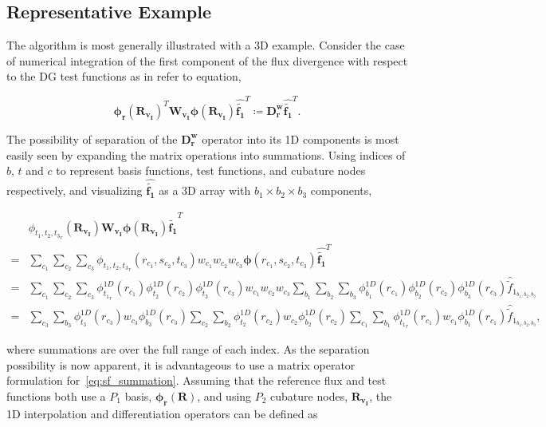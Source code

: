 \documentclass[12pt,Bold,letterpaper,TexShade]{mcgilletdclass}
\numberwithin{equation}{section}
\newcommand{\mat}[1]{\bm{{#1}}}
\newcommand{\vect}[1]{\bm{{#1}}}
\begin{document}
\subsection{Representative Example}
The algorithm is most generally illustrated with a 3D example. Consider the case of numerical integration of the first component of the flux divergence with respect to the DG test functions as in {\color{red} refer to equation},

\begin{equation} \nonumber
\vect{\phi_r}(\mat{R_{v_I}})^T \mat{W_{v_I}} \vect{\phi}(\mat{R_{v_I}}) \vect{\hat{\tilde{f_1}}}^T
\coloneqq
\mat{D^{w}_r} \vect{\hat{\tilde{f_1}}}^T.
\end{equation}

The possibility of separation of the $\mat{D^{w}_r}$ operator into its 1D components is most easily seen by expanding the matrix operations into summations. Using indices of $b$, $t$ and $c$ to represent basis functions, test functions, and cubature nodes respectively, and visualizing $\vect{\hat{\tilde{f_1}}}$ as a 3D array with $b_1 \times b_2 \times b_3$ components,

\begin{align} \label{eq:sf_summation}
& \phi_{{t_1,t_2,t_3}_r}(\mat{R_{v_I}}) \mat{W_{v_I}} \vect{\phi}(\mat{R_{v_I}}) \vect{\hat{\tilde{f_1}}}^T \nonumber \\
= &
\sum\limits_{c_1} \sum\limits_{c_2} \sum\limits_{c_3} 
\phi_{{t_1,t_2,t_3}_r}(r_{c_1},s_{c_2},t_{c_3})
w_{c_1} w_{c_2} w_{c_3}
\vect{\phi}(r_{c_1},s_{c_2},t_{c_3}) \vect{\hat{\tilde{f_1}}}^T \nonumber \\
= &
\sum\limits_{c_1} \sum\limits_{c_2} \sum\limits_{c_3}
\phi^{1D}_{{t_1}_r}(r_{c_1}) \phi^{1D}_{t_2}(r_{c_2}) \phi^{1D}_{t_3}(r_{c_3})
w_{c_1} w_{c_2} w_{c_3}
\sum\limits_{b_1} \sum\limits_{b_2} \sum\limits_{b_3}
\phi^{1D}_{b_1}(r_{c_1}) \phi^{1D}_{b_2}(r_{c_2}) \phi^{1D}_{b_3}(r_{c_3})
\hat{\tilde{f}}_{1_{b_1,b_2,b_3}} \nonumber \\
= &
\sum\limits_{c_3} \sum\limits_{b_3} \phi^{1D}_{t_3}(r_{c_3}) w_{c_3} \phi^{1D}_{b_3}(r_{c_3})
\sum\limits_{c_2} \sum\limits_{b_2} \phi^{1D}_{t_2}(r_{c_2}) w_{c_2} \phi^{1D}_{b_2}(r_{c_2}) 
\sum\limits_{c_1} \sum\limits_{b_1} \phi^{1D}_{{t_1}_r}(r_{c_1}) w_{c_1} \phi^{1D}_{b_1}(r_{c_1})
\hat{\tilde{f}}_{1_{b_1,b_2,b_3}},
\end{align}

where summations are over the full range of each index. As the separation possibility is now apparent, it is advantageous to use a matrix operator formulation for~\eqref{eq:sf_summation}. Assuming that the reference flux and test functions both use a $P_1$ basis, $\vect{\phi_r}(\vect{R})$, and using $P_2$ cubature nodes, $\mat{R_{v_I}}$, the 1D interpolation and differentiation operators can be defined as
\end{document}
